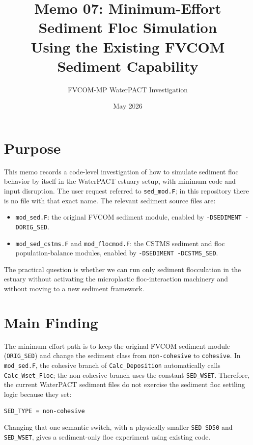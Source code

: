 \documentclass[11pt]{article}
\title{Memo 07: Minimum-Effort Sediment Floc Simulation\\
       Using the Existing FVCOM Sediment Capability}
\author{FVCOM-MP WaterPACT Investigation}
\date{May 2026}
\begin{document}
\sloppy
\maketitle

\section*{Purpose}

This memo records a code-level investigation of how to simulate sediment floc
behavior by itself in the WaterPACT estuary setup, with minimum code and input
disruption.  The user request referred to \texttt{sed\_mod.F}; in this
repository there is no file with that exact name.  The relevant sediment source
files are:
\begin{itemize}
  \item \texttt{mod\_sed.F}: the original FVCOM sediment module, enabled by
        \texttt{-DSEDIMENT -DORIG\_SED}.
  \item \texttt{mod\_sed\_cstms.F} and \texttt{mod\_flocmod.F}: the CSTMS
        sediment and floc population-balance modules, enabled by
        \texttt{-DSEDIMENT -DCSTMS\_SED}.
\end{itemize}

The practical question is whether we can run only sediment flocculation in the
estuary without activating the microplastic floc-interaction machinery and
without moving to a new sediment framework.

\section*{Main Finding}

The minimum-effort path is to keep the original FVCOM sediment module
(\texttt{ORIG\_SED}) and change the sediment class from
\texttt{non-cohesive} to \texttt{cohesive}.  In \texttt{mod\_sed.F}, the
cohesive branch of \texttt{Calc\_Deposition} automatically calls
\texttt{Calc\_Wset\_Floc}; the non-cohesive branch uses the constant
\texttt{SED\_WSET}.  Therefore, the current WaterPACT sediment files do not
exercise the sediment floc settling logic because they set:
\begin{verbatim}
SED_TYPE = non-cohesive
\end{verbatim}

Changing that one semantic switch, with a physically smaller
\texttt{SED\_SD50} and \texttt{SED\_WSET}, gives a sediment-only floc
experiment using existing code.
\end{document}
